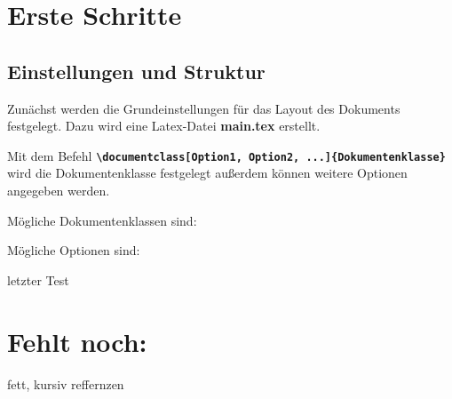 \section{Erste Schritte}
\subsection{Einstellungen und Struktur}

Zunächst werden die Grundeinstellungen für das Layout des Dokuments festgelegt. Dazu wird eine Latex-Datei \textbf{main.tex} erstellt.

Mit dem Befehl \textbf{\texttt{\textbackslash documentclass[Option1, Option2, ...]\{Dokumentenklasse\}}} wird die Dokumentenklasse festgelegt außerdem können weitere Optionen angegeben werden. 

Mögliche Dokumentenklassen sind:


Mögliche Optionen sind:


letzter Test

\section{Fehlt noch:}

fett, kursiv
reffernzen
%
